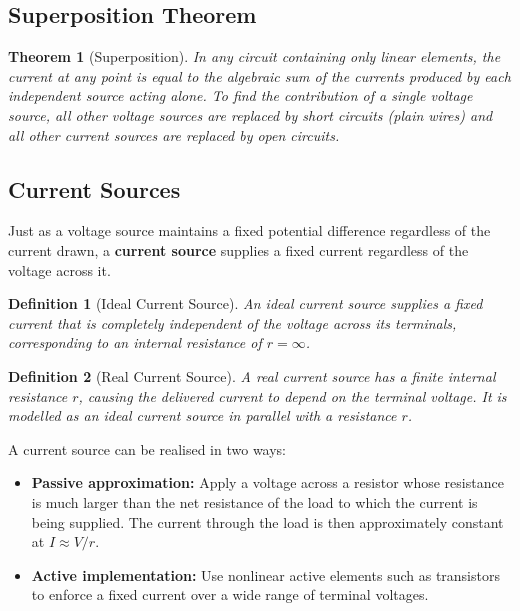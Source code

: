 \documentclass{article}
\newtheorem{theorem}{Theorem}
\newtheorem{definition}{Definition}
\begin{document}
\subsection{Superposition Theorem}

\begin{theorem}[Superposition]
    In any circuit containing only linear elements, the current at any point is equal to the algebraic sum of the currents produced by each independent source acting alone. To find the contribution of a single voltage source, all other voltage sources are replaced by short circuits (plain wires) and all other current sources are replaced by open circuits.
\end{theorem}

\subsection{Current Sources}

Just as a voltage source maintains a fixed potential difference regardless of the current drawn, a \textbf{current source} supplies a fixed current regardless of the voltage across it.

\begin{definition}[Ideal Current Source]
    An ideal current source supplies a fixed current that is completely independent of the voltage across its terminals, corresponding to an internal resistance of $r = \infty$.
\end{definition}

\begin{definition}[Real Current Source]
    A real current source has a finite internal resistance $r$, causing the delivered current to depend on the terminal voltage. It is modelled as an ideal current source in parallel with a resistance $r$.
\end{definition}

A current source can be realised in two ways:
\begin{itemize}
    \item \textbf{Passive approximation:} Apply a voltage across a resistor whose resistance is much larger than the net resistance of the load to which the current is being supplied. The current through the load is then approximately constant at $I \approx V/r$.
    \item \textbf{Active implementation:} Use nonlinear active elements such as transistors to enforce a fixed current over a wide range of terminal voltages.
\end{itemize}
\end{document}
